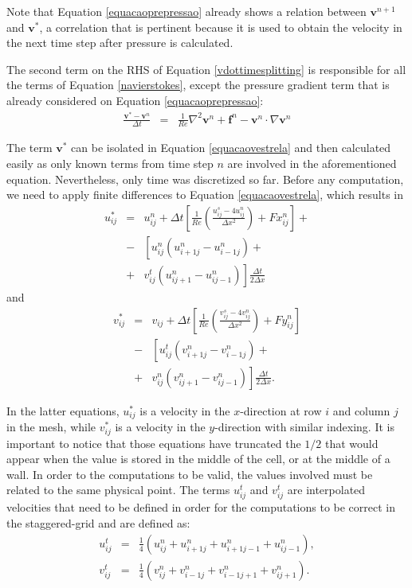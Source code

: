\documentclass[journal]{IEEEtran}
\begin{document}
Note that Equation \ref{equacaoprepressao} already shows a relation between $\mathbf{v}^{n+1}$ and $\mathbf{v}^{*}$, a correlation that is pertinent because it is used to obtain the velocity in the next time step after pressure is calculated.


The second term on the RHS of Equation \ref{vdottimesplitting} is responsible for all the terms of Equation \ref{navierstokes}, except the pressure gradient term that is already considered on Equation \ref{equacaoprepressao}: \begin{eqnarray}
\frac{\textbf{v}^{*}-\textbf{v}^n}{\Delta t}&=& \frac{1}{\mathit{Re}}\nabla ^2 \textbf{v}^n + \textbf{f}^n - \textbf{v}^n\cdot \nabla \textbf{v}^n\label{equacaovestrela}
\end{eqnarray}

The term $\mathbf{v}^*$ can be isolated in Equation \ref{equacaovestrela} and then calculated easily as only known terms from time step $n$ are involved in the aforementioned equation. Nevertheless, only time was discretized so far. Before any computation, we need to apply finite differences to Equation \ref{equacaovestrela}, which results in %
\begin{eqnarray}
u_{ij}^{*}&=&u_{ij}^n+\Delta t\left[\frac{1}{\mathit{Re}}\left(\frac{u_{ij}^s-4u_{ij}^n}{\Delta
x^2}\right)+Fx_{ij}^n\right] + \nonumber \\
&-&\left[u_{ij}^n(u_{i+1j}^n-u_{i-1j}^n)+ \right.\nonumber \\
&+& \left. v_{ij}^t(u_{ij+1}^n-u_{ij-1}^n)\right]\frac{\Delta t}{2\Delta x}\; \label{step1-3}
\end{eqnarray}
and
\begin{eqnarray}
v_{ij}^{*}&=&v_{ij}+\Delta t\left[\frac{1}{\mathit{Re}}\left(\frac{v_{ij}^s-4v_{ij}^n}{\Delta
x^2}\right)+Fy_{ij}^n\right] \nonumber \\
&-&\left[u_{ij}^t (v_{i+1j}^n-v_{i-1j}^n)+ \right.\nonumber \\
&+& \left. v_{ij}^n(v_{ij+1}^n-v_{ij-1}^n)\right]\frac{\Delta t}{2\Delta x}.\label{step1-4}
\end{eqnarray}

In the latter equations, $u^*_{ij}$ is a velocity in the $x$-direction at row $i$ and column $j$ in the mesh, while $v^*_{ij}$ is a velocity in the $y$-direction with similar indexing. It is important to notice that those equations have truncated the $1/2$ that would appear when the value is stored in the middle of the cell, or at the middle of a wall. In order to the computations to be valid, the values involved must be related to the same physical point. The terms $u_{ij}^t$ and $v_{ij}^t$ are interpolated velocities that need to be defined in order for the computations to be correct in the staggered-grid and are defined as: \begin{eqnarray}
u_{ij}^t&=&\frac{1}{4}(u_{ij}^n+u_{i+1j}^n+u_{i+1j-1}^n+u_{ij-1}^n) \label{ut},\\ 
v_{ij}^t &=& \frac{1}{4}(v_{ij}^n+v_{i-1j}^n+v_{i-1j+1}^n+v_{ij+1}^n). \label{vt}
\end{eqnarray}
\end{document}
